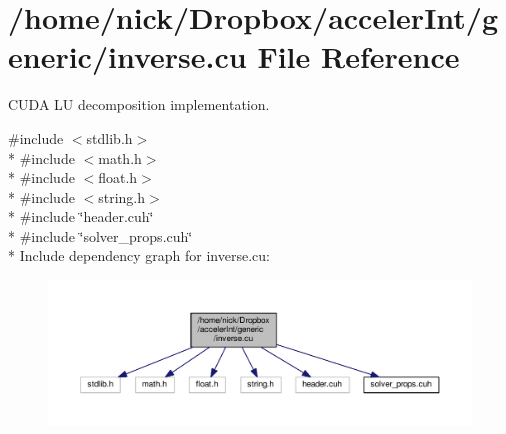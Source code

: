 \hypertarget{inverse_8cu}{}\section{/home/nick/\+Dropbox/acceler\+Int/generic/inverse.cu File Reference}
\label{inverse_8cu}


C\+U\+DA LU decomposition implementation.  


{\ttfamily \#include $<$stdlib.\+h$>$}\\*
{\ttfamily \#include $<$math.\+h$>$}\\*
{\ttfamily \#include $<$float.\+h$>$}\\*
{\ttfamily \#include $<$string.\+h$>$}\\*
{\ttfamily \#include \char`\"{}header.\+cuh\char`\"{}}\\*
{\ttfamily \#include \char`\"{}solver\+\_\+props.\+cuh\char`\"{}}\\*
Include dependency graph for inverse.\+cu\+:
\nopagebreak
\begin{figure}[H]
\begin{center}
\leavevmode
\includegraphics[width=350pt]{inverse_8cu__incl}
\end{center}
\end{figure}
